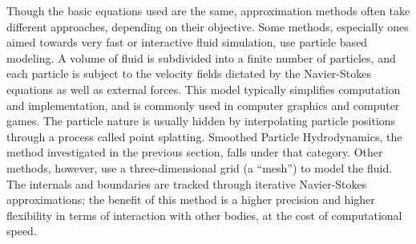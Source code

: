 \documentclass[a4paper,twocolumn]{article}
\begin{document}
Though the basic equations used are the same, approximation methods often take different approaches, depending on their objective. Some methods, especially ones aimed towards very fast or interactive fluid simulation, use particle based modeling. A volume of fluid is subdivided into a finite number of particles, and each particle is subject to the velocity fields dictated by the Navier-Stokes equations as well as external forces. This model typically simplifies computation and implementation, and is commonly used in computer graphics and computer games. The particle nature is usually hidden by interpolating particle positions through a process called point splatting. Smoothed Particle Hydrodynamics, the method investigated in the previous section, falls under that category.  Other methods, however, use a three-dimensional grid (a ``mesh'') to model the fluid. The internals and boundaries are tracked through iterative Navier-Stokes approximations; the benefit of this method is a higher precision and higher flexibility in terms of interaction with other bodies, at the cost of computational speed. 
\end{document}
